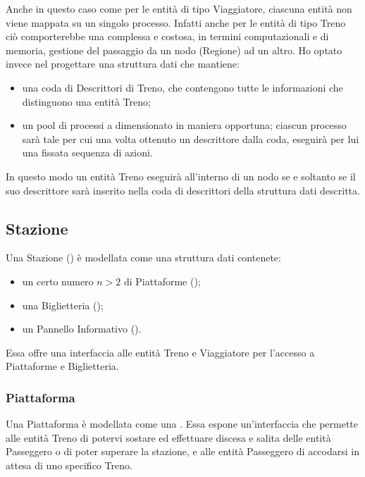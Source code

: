 	Anche in questo caso come per le entità di tipo Viaggiatore, ciascuna entità non viene mappata su un singolo processo. Infatti anche per le entità di tipo Treno ciò comporterebbe una complessa e costosa, in termini computazionali e di memoria, gestione del passaggio da un nodo (Regione) ad un altro. Ho optato invece nel progettare una struttura dati che mantiene:
		\begin{itemize}
			\item una coda di Descrittori di Treno, che contengono tutte le informazioni che distinguono una entità Treno;
			\item un pool di processi a dimensionato in maniera opportuna; ciascun processo sarà tale per cui una volta ottenuto un descrittore dalla coda, eseguirà per lui una fissata sequenza di azioni.
		\end{itemize}
	In questo modo un entità Treno eseguirà all'interno di un nodo se e soltanto se il suo descrittore sarà inserito nella coda di descrittori della struttura dati descritta.
				
	\subsection{Stazione}
	
	Una Stazione () è modellata come una struttura dati contenete:
		\begin{itemize}
			\item un certo numero $ n > 2$ di Piattaforme ();
			\item una Biglietteria ();
			\item un Pannello Informativo ().
		\end{itemize}
	Essa offre una interfaccia alle entità Treno e Viaggiatore per l'accesso a Piattaforme e Biglietteria.
		
		\subsubsection{Piattaforma}
	
		Una Piattaforma è modellata come una . Essa espone un'interfaccia che permette alle entità Treno di potervi sostare ed effettuare discesa e salita delle entità Passeggero o di poter superare la stazione, e alle entità Passeggero di accodarsi in attesa di uno specifico Treno.
		
